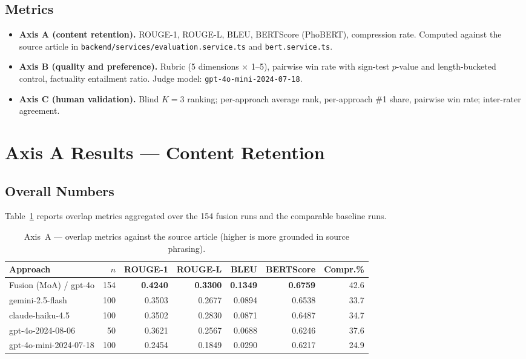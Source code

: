 \subsection{Metrics}

\begin{itemize}
  \item \textbf{Axis A (content retention).} ROUGE-1, ROUGE-L, BLEU,
        BERTScore (PhoBERT), compression rate. Computed against the
        source article in
        \texttt{backend/services/evaluation.service.ts} and
        \texttt{bert.service.ts}.
  \item \textbf{Axis B (quality and preference).} Rubric (5 dimensions
        $\times$ 1--5), pairwise win rate with sign-test $p$-value and
        length-bucketed control, factuality entailment ratio.
        Judge model: \texttt{gpt-4o-mini-2024-07-18}.
  \item \textbf{Axis C (human validation).} Blind $K = 3$ ranking;
        per-approach average rank, per-approach \#1 share, pairwise
        win rate; inter-rater agreement.
\end{itemize} 

\section{Axis A Results --- Content Retention}

\subsection{Overall Numbers}

Table~\ref{tab:axisA} reports overlap metrics aggregated over the 154
fusion runs and the comparable baseline runs.

\begin{table}[H]
  \centering
  \small
  \setlength{\tabcolsep}{4pt}
  \caption{Axis~A --- overlap metrics against the source article
  (higher is more grounded in source phrasing).}
  \label{tab:axisA}
  \begin{tabularx}{\linewidth}{Xrrrrrr}
    \toprule
    Approach & $n$ & ROUGE-1 & ROUGE-L & BLEU & BERTScore & Compr.\% \\
    \midrule
    Fusion (MoA) / gpt-4o        & 154 & \textbf{0.4240} & \textbf{0.3300} & \textbf{0.1349} & \textbf{0.6759} & 42.6 \\
    gemini-2.5-flash             & 100 & 0.3503 & 0.2677 & 0.0894 & 0.6538 & 33.7 \\
    claude-haiku-4.5             & 100 & 0.3502 & 0.2830 & 0.0871 & 0.6487 & 34.7 \\
    gpt-4o-2024-08-06            & 50  & 0.3621 & 0.2567 & 0.0688 & 0.6246 & 37.6 \\
    gpt-4o-mini-2024-07-18       & 100 & 0.2454 & 0.1849 & 0.0290 & 0.6217 & 24.9 \\
    \bottomrule
  \end{tabularx}
\end{table}

